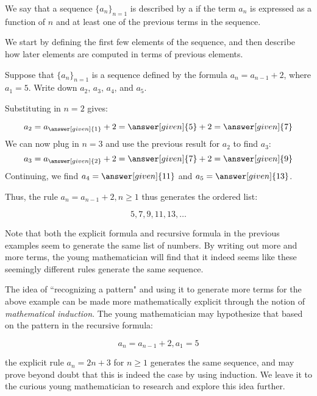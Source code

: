\documentclass{ximera}
\begin{document}
\begin{definition}
We say that a sequence $\{a_n\}_{n=1}$ is described by a  if the term $a_n$ is expressed as a function of $n$ and at least one of the previous terms in the sequence.
\end{definition}

We start by defining the first few elements of the sequence, and then describe how later elements are computed in terms of previous elements.

\begin{example}
 Suppose that $\{a_n\}_{n=1}$ is a sequence defined by the formula $a_n = a_{n-1}+2$, where $a_1 = 5$.  Write down $a_2$, $a_3$, $a_4$, and $a_5$.
 
 \begin{explanation}
 Substituting in $n=2$ gives:
 
 \[
 a_2 = a_{\answer[given]{1}}+2 = \answer[given]{5}+2 = \answer[given]{7}
 \]
 We can now plug in $n=3$ and use the previous result for $a_2$ to find $a_3$:
  \[
 a_3 = a_{\answer[given]{2}}+2 = \answer[given]{7}+2 = \answer[given]{9}
 \]
 Continuing, we find $a_4 = \answer[given]{11}$ and $a_5 = \answer[given]{13}$.
 
 Thus, the rule $a_n = a_{n-1}+2, n \geq 1$ thus generates the ordered list:

\[
5,7,9,11,13, \dots
\]   

 \end{explanation}
\end{example}

Note that both the explicit formula and recursive formula in the previous examples seem to generate the same list of numbers.  By writing out more and more terms, the young mathematician will find that it indeed seems like these seemingly different rules generate the same sequence.

  \begin{remark}
  The idea of ``recognizing a pattern" and using it to generate more terms for the above example can be made more mathematically explicit through the notion of \emph{mathematical induction}.  The young mathematician may hypothesize that based on the pattern in the recursive formula:
  
  \[
  a_n = a_{n-1}+2, a_1 = 5
  \]
  
  the explicit rule $a_n = 2n+3$ for $n \geq 1$ generates the same sequence, and may prove beyond doubt that this is indeed the case by using induction.  We leave it to the curious young mathematician to research and explore this idea further.
  \end{remark}
  
\end{document}
